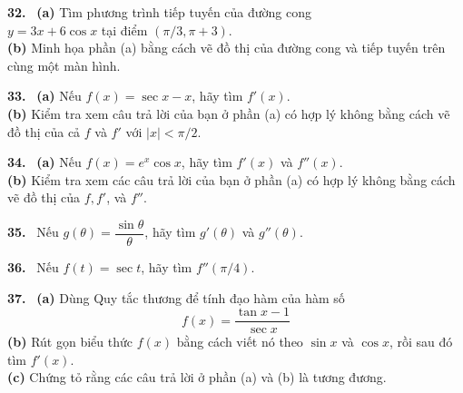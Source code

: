 \begin{minipage}[t]{0.485\textwidth}
\textbf{32.} \ \textbf{(a)} Tìm phương trình tiếp tuyến của đường cong\\
\hspace*{5.5mm}$y = 3x + 6 \cos x$ tại điểm $(\pi/3, \pi + 3)$.\\[1.2mm]
\llap{\casicon\hspace{1.5mm}}\hspace*{5.5mm}\textbf{(b)} Minh họa phần (a) bằng cách vẽ đồ thị của đường cong và tiếp tuyến trên cùng một màn hình.\par\vspace{2.8mm}

\textbf{33.} \ \textbf{(a)} Nếu $f(x) = \sec x - x$, hãy tìm $f'(x)$.\\[1.2mm]
\llap{\casicon\hspace{1.5mm}}\hspace*{5.5mm}\textbf{(b)} Kiểm tra xem câu trả lời của bạn ở phần (a) có hợp lý không bằng cách vẽ đồ thị của cả $f$ và $f'$ với $|x| < \pi/2$.\par\vspace{2.8mm}

\textbf{34.} \ \textbf{(a)} Nếu $f(x) = e^x \cos x$, hãy tìm $f'(x)$ và $f''(x)$.\\[1.2mm]
\llap{\casicon\hspace{1.5mm}}\hspace*{5.5mm}\textbf{(b)} Kiểm tra xem các câu trả lời của bạn ở phần (a) có hợp lý không bằng cách vẽ đồ thị của $f, f'$, và $f''$.\par\vspace{2.8mm}

\textbf{35.} \ Nếu $g(\theta) = \dfrac{\sin \theta}{\theta}$, hãy tìm $g'(\theta)$ và $g''(\theta)$.\par\vspace{2.8mm}

\textbf{36.} \ Nếu $f(t) = \sec t$, hãy tìm $f''(\pi/4)$.\par\vspace{2.8mm}

\textbf{37.} \ \textbf{(a)} Dùng Quy tắc thương để tính đạo hàm của hàm số
\[
f(x) = \frac{\tan x - 1}{\sec x}
\]
\hspace*{5.5mm}\textbf{(b)} Rút gọn biểu thức $f(x)$ bằng cách viết nó theo $\sin x$ và $\cos x$, rồi sau đó tìm $f'(x)$.\\[1mm]
\hspace*{5.5mm}\textbf{(c)} Chứng tỏ rằng các câu trả lời ở phần (a) và (b) là tương đương.\par\vspace{2.8mm}


\end{minipage}
